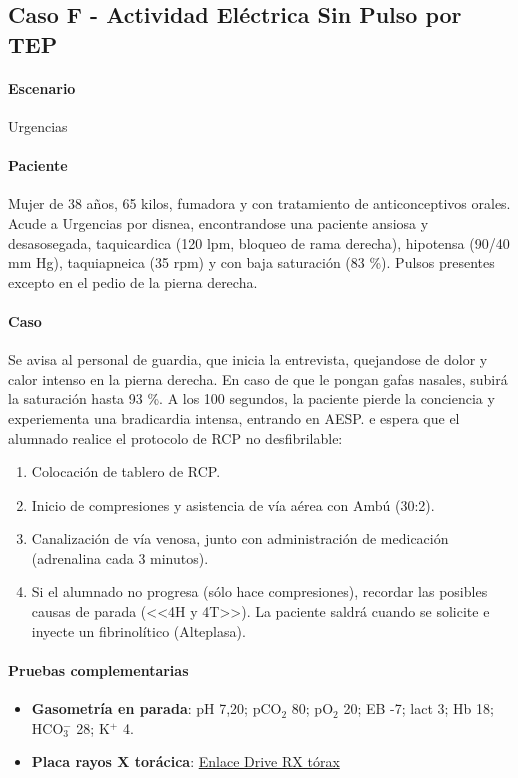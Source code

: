 \subsection{Caso F - Actividad Eléctrica Sin Pulso por TEP}
\paragraph{Escenario} Urgencias
\vspace{-12.5pt}
\paragraph{Paciente} Mujer de 38 años, 65 kilos, fumadora y con tratamiento de anticonceptivos orales. Acude a Urgencias por disnea, encontrandose una paciente ansiosa y desasosegada, taquicardica (120 lpm, bloqueo de rama derecha), hipotensa (90/40 mm Hg), taquiapneica (35 rpm) y con baja saturación (83 \%). Pulsos presentes excepto en el pedio de la pierna derecha.
\vspace{-12.5pt}
\paragraph{Caso} Se avisa al personal de guardia, que inicia la entrevista, quejandose de dolor y calor intenso en la pierna derecha. En caso de que le pongan gafas nasales, subirá la saturación hasta 93 \%. A los 100 segundos, la paciente pierde la conciencia y experiementa una bradicardia intensa, entrando en AESP. e espera que el alumnado realice el protocolo de RCP no desfibrilable:
\begin{enumerate}[topsep=0pt, partopsep=0pt,itemsep=0pt,parsep=0pt]
    \item Colocación de tablero de RCP.
    \item Inicio de compresiones y asistencia de vía aérea con Ambú (30:2).
    \item Canalización de vía venosa, junto con administración de medicación (adrenalina cada 3 minutos).
    \item Si el alumnado no progresa (sólo hace compresiones), recordar las posibles causas de parada (<<4H y 4T>>). La paciente saldrá cuando se solicite e inyecte un fibrinolítico (Alteplasa).
\end{enumerate}
\vspace{-12.5pt}
\paragraph{Pruebas complementarias}
\begin{itemize}[topsep=0pt, partopsep=0pt,itemsep=0pt,parsep=0pt]
    \item \textbf{Gasometría en parada}: pH 7,20; pCO$_2$ 80; pO$_2$ 20; EB -7; lact 3; Hb 18; HCO$_3^-$ 28; K$^+$ 4.
    \item \textbf{Placa rayos X torácica}: \href{https://drive.google.com/file/d/10ItN9kxon6yGTPyf2Ivz0IKLV\_dT4vii/view?usp=share\_link}{Enlace Drive RX tórax}
\end{itemize}

